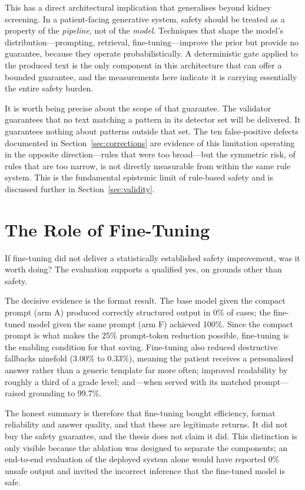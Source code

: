 This has a direct architectural implication that generalises beyond kidney
screening. In a patient-facing generative system, safety should be treated as a
property of the \emph{pipeline}, not of the \emph{model}. Techniques that shape
the model's distribution---prompting, retrieval, fine-tuning---improve the prior
but provide no guarantee, because they operate probabilistically. A deterministic
gate applied to the produced text is the only component in this architecture
that can offer a bounded guarantee, and the measurements here indicate it is
carrying essentially the entire safety burden.

It is worth being precise about the scope of that guarantee. The validator
guarantees that no text matching a pattern in its detector set will be delivered.
It guarantees nothing about patterns outside that set. The ten false-positive
defects documented in Section~\ref{sec:corrections} are evidence of this
limitation operating in the opposite direction---rules that were too broad---but
the symmetric risk, of rules that are too narrow, is not directly measurable
from within the same rule system. This is the fundamental epistemic limit of
rule-based safety and is discussed further in Section~\ref{sec:validity}.

\section{The Role of Fine-Tuning}
\label{sec:disc_finetune}

If fine-tuning did not deliver a statistically established safety improvement,
was it worth doing? The evaluation supports a qualified yes, on grounds other
than safety.

The decisive evidence is the format result. The base model given the compact
prompt (arm A) produced correctly structured output in 0\% of cases; the
fine-tuned model given the same prompt (arm F) achieved 100\%. Since the compact
prompt is what makes the 25\% prompt-token reduction possible, fine-tuning is
the enabling condition for that saving. Fine-tuning also reduced destructive
fallbacks ninefold (3.00\% to 0.33\%), meaning the patient receives a
personalised answer rather than a generic template far more often; improved
readability by roughly a third of a grade level; and---when served with its matched
prompt---raised grounding to 99.7\%.

The honest summary is therefore that fine-tuning bought efficiency, format
reliability and answer quality, and that these are legitimate returns. It did
not buy the safety guarantee, and the thesis does not claim it did. This
distinction is only visible because the ablation was designed to separate the
components; an end-to-end evaluation of the deployed system alone would have
reported 0\% unsafe output and invited the incorrect inference that the
fine-tuned model is safe.

